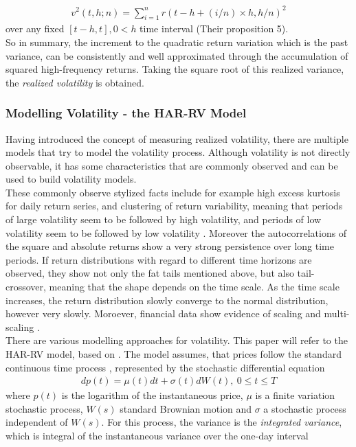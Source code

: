\begin{align}\label{eq:RV-andersen}
v^2(t,h;n) = \sum_{i=1}^{n} r(t-h+(i/n) \times h,h/n)^2
\end{align}
over any fixed $[t-h,t], 0 < h$ time interval (Their proposition 5).\\
So in summary, the increment to the quadratic return variation which is the past variance, can be consistently and well approximated through the accumulation of squared high-frequency returns. Taking the square root of this realized variance, the \emph{realized volatility} is obtained.


\subsubsection{Modelling Volatility - the HAR-RV Model}\label{sec:222HAR-RV}
Having introduced the concept of measuring realized volatility, there are multiple models that try to model the volatility process. Although volatility is not directly observable, it has some characteristics that are commonly observed and can be used to build volatility models. \\
These commonly observe stylized facts include for example high excess kurtosis for daily return series, and clustering of return variability, meaning that periods of large volatility seem to be followed by high volatility, and periods of low volatility seem to be followed by low volatility \parencite{tsay2005}. Moreover the autocorrelations of the square and absolute returns show a very strong persistence over long time periods. If return distributions with regard to different time horizons are observed, they show not only the fat tails mentioned above, but also tail-crossover, meaning that the shape depends on the time scale. As the time scale increases, the return distribution slowly converge to the normal distribution, however very slowly. Moroever, financial data show evidence of scaling and multi-scaling \textcite{corsi2009}. \\
There are various modelling approaches for volatility. This paper will refer to the HAR-RV model, based on \textcite{corsi2009}. The model assumes, that prices follow the standard continuous time process , represented by the stochastic differential equation
\begin{align}\label{eq:return-process-corsi}
dp(t) = \mu(t)dt + \sigma(t)dW(t), \ 0 \leq t \leq T
\end{align}
where $p(t)$ is the logarithm of the instantaneous price, $\mu$ is a finite variation stochastic process, $W(s)$ standard Brownian motion and $\sigma$ a stochastic process independent of $W(s)$. For this process, the variance is the \emph{integrated variance}, which is integral of the instantaneous variance over the one-day interval

